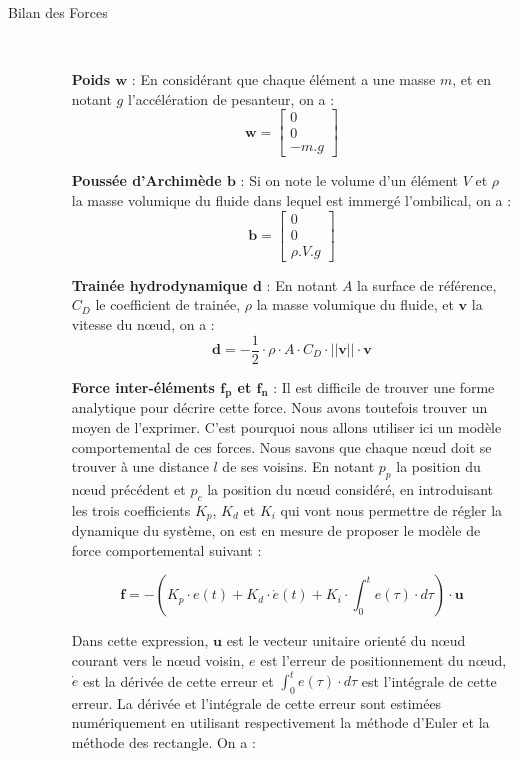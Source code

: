     \begin{description}
        \item [Bilan des Forces] \
    \begin{itemize}
        \item[\textbf{Poids $\mathbf{w}$} :] En considérant que chaque élément a une masse $m$, et en notant $g$ l'accélération de pesanteur, on a : $$\mathbf{w} = \begin{bmatrix}0\\ 0\\ -m.g\end{bmatrix}$$

        \item[\textbf{Poussée d'Archimède $\mathbf{b}$} :] Si on note le volume d'un élément $V$ et $\rho$ la masse volumique du fluide dans lequel est immergé l'ombilical, on a : $$\mathbf{b} = \begin{bmatrix}0\\ 0\\ \rho.V.g\end{bmatrix}$$

        \item[\textbf{Trainée hydrodynamique $\mathbf{d}$} :] En notant $A$ la surface de référence, $C_D$ le coefficient de trainée, $\rho$ la masse volumique du fluide, et $\mathbf{v}$ la vitesse du n\oe ud, on a : $$\mathbf{d} = - \frac{1}{2} \cdot \rho \cdot A \cdot C_D \cdot ||\mathbf{v}|| \cdot \mathbf{v}$$
        
        \item[\textbf{Force inter-éléments $\mathbf{f_p}$ et $\mathbf{f_n}$} :] Il est difficile de trouver une forme analytique pour décrire cette force. Nous avons toutefois trouver un moyen de l'exprimer. C'est pourquoi nous allons utiliser ici un modèle comportemental de ces forces. Nous savons que chaque n\oe ud doit se trouver à une distance $l$ de ses voisins. En notant $p_{p}$ la position du n\oe ud précédent et $p_{c}$ la position du n\oe ud considéré, en introduisant les trois coefficients $K_p$, $K_d$ et $K_i$ qui vont nous permettre de régler la dynamique du système, on est en mesure de proposer le modèle de force comportemental suivant :
        
        $$\mathbf{f} = - \left(K_p \cdot e(t) + K_d \cdot \dot e(t) + K_i \cdot \int_{0}^te(\tau) \cdot d\tau \right) \cdot \mathbf{u}$$
        
        Dans cette expression, $\mathbf{u}$ est le vecteur unitaire orienté du n\oe ud courant vers le n\oe ud voisin, $e$ est l'erreur de positionnement du n\oe ud, $\dot e$ est la dérivée de cette erreur et $\int_{0}^te(\tau) \cdot d\tau$ est l'intégrale de cette erreur. La dérivée et l'intégrale de cette erreur sont estimées numériquement en utilisant respectivement la méthode d'Euler et la méthode des rectangle. On a :
        

\end{itemize}
\end{description}

